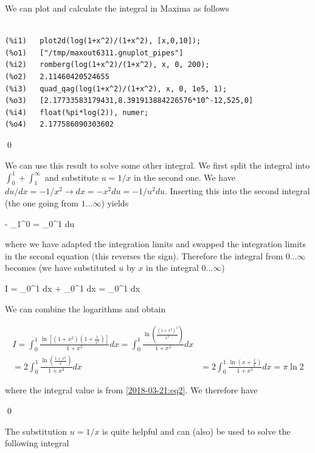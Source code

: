 We can plot and calculate the integral in Maxima as follows

\begin{verbatim}

(%i1)	plot2d(log(1+x^2)/(1+x^2), [x,0,10]);
(%o1)	["/tmp/maxout6311.gnuplot_pipes"]
(%i2)	romberg(log(1+x^2)/(1+x^2), x, 0, 200);
(%o2)	2.11460420524655
(%i3)	quad_qag(log(1+x^2)/(1+x^2), x, 0, 1e5, 1);
(%o3)	[2.17733583179431,8.391913884226576*10^-12,525,0]
(%i4)	float(%pi*log(2)), numer;
(%o4)	2.177586090303602

\end{verbatim}

\qed

We can use this result to solve some other integral. We first split the integral into $\int_0^1 + \int_1^\infty$ and substitute $u = 1/x$ in the second one. We have $du/dx=-1/x^2 \rightarrow dx = -x^2 du = -1/u^2 du$. Inserting this into the second integral (the one going from $1\ldots \infty$) yields

\bee
- \int_1^0   = \int_0^1  du
\eee

where we have adapted the integration limits and swapped the integration limits in the second equation (this reverses the sign). Therefore the integral from $0\ldots \infty$ becomes (we have substituted $u$ by $x$ in the integral $0\ldots\infty$)

\bee
I = \int_0^1 dx + \int_0^1 dx = \int_0^1  dx
\eee

We can combine the logarithms and obtain

\begin{align*}
I = \int_0^1 \frac{\ln \left[ (1+x^2) (1+\frac{1}{x^2})\right]}{1+x^2} dx = \int_0^1 \frac{\ln \left( \frac{(1+x^2)^2}{x^2}\right)}{1+x^2} dx & \\ = 2 \int_0^1 \frac{\ln \left( \frac{1+x^2}{x}\right)}{1+x^2} dx & = 2 \int_0^1 \frac{\ln \left( x + \frac{1}{x}\right)}{1+x^2} dx = \pi \ln 2
\end{align*}

where the integral value is from \eqref{2018-03-21:eq2}. We therefore have

\bee
{} \qed
\eee

The substitution $u = 1/x$ is quite helpful and can (also) be used to solve the following integral

